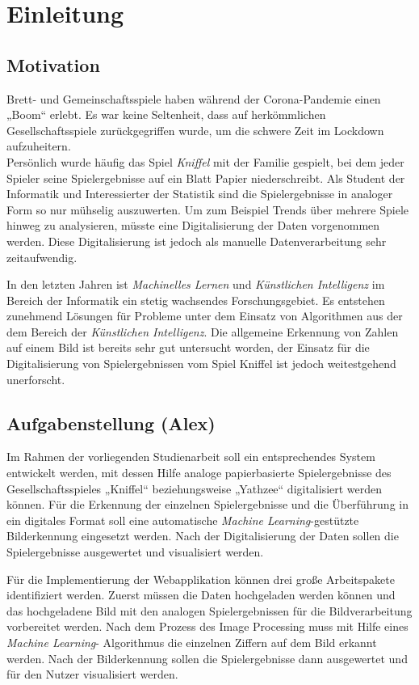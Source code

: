 \chapter{Einleitung}
\section{Motivation}
Brett- und Gemeinschaftsspiele haben während der Corona-Pandemie einen „Boom“ erlebt. Es war keine Seltenheit, dass auf herkömmlichen Gesellschaftsspiele zurückgegriffen wurde, um die schwere Zeit im Lockdown aufzuheitern. \cite{dw_2021}\\
Persönlich wurde häufig das Spiel \textit{Kniffel} mit der Familie gespielt, bei dem jeder Spieler seine Spielergebnisse auf ein Blatt Papier niederschreibt. Als Student der Informatik und Interessierter der Statistik sind die Spielergebnisse in analoger Form so nur mühselig auszuwerten. Um zum Beispiel Trends über mehrere Spiele hinweg zu analysieren, müsste eine Digitalisierung der Daten vorgenommen werden. Diese Digitalisierung ist jedoch als manuelle Datenverarbeitung sehr zeitaufwendig.

In den letzten Jahren ist \textit{Machinelles Lernen} und \textit{Künstlichen Intelligenz} im Bereich der Informatik ein stetig wachsendes Forschungsgebiet. 
Es entstehen zunehmend Lösungen für Probleme unter dem Einsatz von Algorithmen aus der dem Bereich der \textit{Künstlichen Intelligenz}. Die allgemeine Erkennung von Zahlen auf einem Bild ist bereits sehr gut untersucht worden, der Einsatz für die Digitalisierung von Spielergebnissen vom Spiel Kniffel ist jedoch weitestgehend unerforscht. 

\section{Aufgabenstellung (Alex)}
Im Rahmen der vorliegenden Studienarbeit soll ein entsprechendes System entwickelt werden, mit dessen Hilfe analoge papierbasierte Spielergebnisse des
Gesellschaftsspieles „Kniffel“ beziehungsweise „Yathzee“ digitalisiert werden können. Für die Erkennung der einzelnen Spielergebnisse und die Überführung in ein digitales Format soll eine automatische \textit{Machine Learning}-gestützte Bilderkennung eingesetzt werden. Nach der Digitalisierung der Daten sollen die Spielergebnisse ausgewertet und visualisiert werden.

Für die Implementierung der Webapplikation können drei große Arbeitspakete identifiziert werden. Zuerst müssen die Daten hochgeladen werden können und das hochgeladene Bild mit den analogen Spielergebnissen für die Bildverarbeitung vorbereitet werden. Nach dem Prozess des Image Processing muss mit Hilfe eines \textit{Machine Learning}-
Algorithmus die einzelnen Ziffern auf dem Bild erkannt werden.
Nach der Bilderkennung sollen die Spielergebnisse dann ausgewertet und für den Nutzer visualisiert werden.

